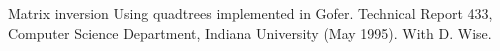 \documentclass{article}
\begin{document}
\smallskip
\hangindent=0.25in 
Matrix inversion Using quadtrees implemented in Gofer.
Technical Report 433, Computer Science Department, Indiana University
(May 1995).  With D. Wise.





\end{document}
